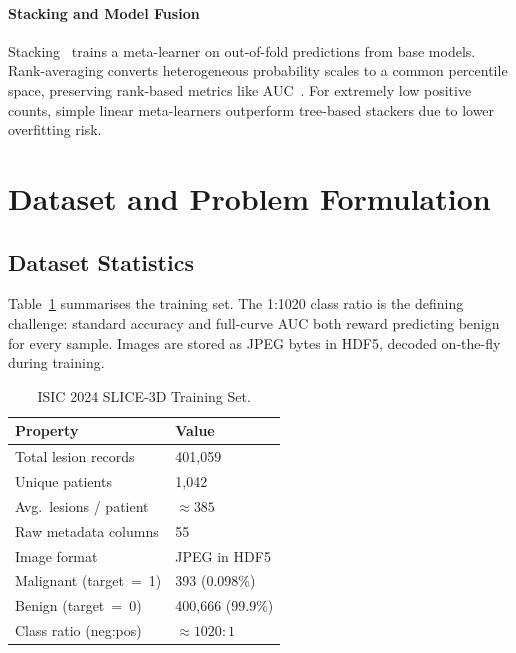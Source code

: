\documentclass[conference]{IEEEtran}
\begin{document}
\paragraph{Stacking and Model Fusion}
Stacking~\cite{wolpert1992stacked} trains a meta-learner on
out-of-fold predictions from base models. Rank-averaging converts
heterogeneous probability scales to a common percentile space,
preserving rank-based metrics like AUC~\cite{caruana2004ensemble}.
For extremely low positive counts, simple linear meta-learners
outperform tree-based stackers due to lower overfitting risk.

\section{Dataset and Problem Formulation}

\subsection{Dataset Statistics}

Table~\ref{tab:dataset} summarises the training set.
The 1:1020 class ratio is the defining challenge: standard accuracy
and full-curve AUC both reward predicting benign for every sample.
Images are stored as JPEG bytes in HDF5, decoded on-the-fly during
training.

\begin{table}[!t]
  \centering
  \caption{ISIC 2024 SLICE-3D Training Set.}
  \label{tab:dataset}
  \renewcommand{\arraystretch}{1.1}
  \begin{tabular}{ll}
    \toprule
    \textbf{Property} & \textbf{Value} \\
    \midrule
    Total lesion records        & 401,059 \\
    Unique patients             & 1,042 \\
    Avg.\ lesions / patient     & $\approx 385$ \\
    Raw metadata columns        & 55 \\
    Image format                & JPEG in HDF5 \\
    Malignant (target~=~1)      & 393 (0.098\%) \\
    Benign (target~=~0)         & 400,666 (99.9\%) \\
    Class ratio (neg:pos)       & $\approx 1020:1$ \\
    \bottomrule
  \end{tabular}
\end{table}
\end{document}
